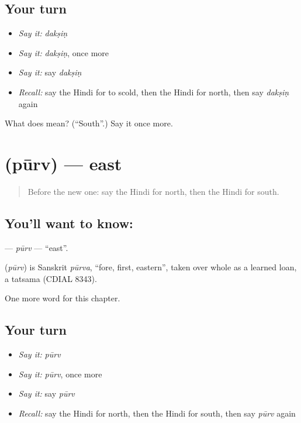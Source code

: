 \subsection*{Your turn}
\begin{itemize}
\raggedright
  \item \emph{Say it:} \emph{dakṣiṇ}
  \item \emph{Say it:} \emph{dakṣiṇ}, once more
  \item \emph{Say it:} say \emph{dakṣiṇ}
  \item \emph{Recall:} say the Hindi for to scold, then the Hindi for north, then say \emph{dakṣiṇ} again
\end{itemize}

\begin{tcolorbox}[breakable,colback=teal!4,colframe=teal!35!black,title={Before you move on}]
What does  mean? (\textquotedblleft{}South\textquotedblright{}.) Say it once more.
\end{tcolorbox}
\section[\texorpdfstring{\hi{पूर्व} (pūrv)}{पूर्व (pūrv)}]{ (pūrv) — east}

\label{lesson:HI-C233-purv}



\begin{quote}
Before the new one: say the Hindi for north, then the Hindi for south.
\end{quote}

\subsection*{You'll want to know: }
\textbf{} — \emph{pūrv} — \textquotedblleft{}east\textquotedblright{}.

\begin{cousinweb}
\textbf{} (\emph{pūrv}) is Sanskrit \emph{pūrva}, \textquotedblleft{}fore, first, eastern\textquotedblright{}, taken over whole as a learned loan, a tatsama (CDIAL 8343).
\end{cousinweb}

\begin{grammarlens}[title={What you've built}]
One more word for this chapter.
\end{grammarlens}

\subsection*{Your turn}
\begin{itemize}
\raggedright
  \item \emph{Say it:} \emph{pūrv}
  \item \emph{Say it:} \emph{pūrv}, once more
  \item \emph{Say it:} say \emph{pūrv}
  \item \emph{Recall:} say the Hindi for north, then the Hindi for south, then say \emph{pūrv} again
\end{itemize}

